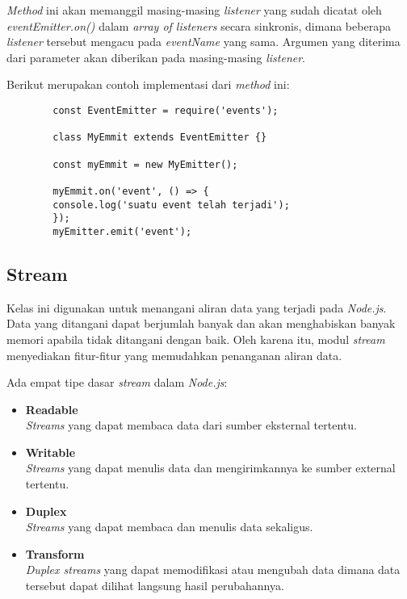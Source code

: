 \begin{itemize}
	\textit{Method} ini akan memanggil masing-masing \textit{listener} yang sudah dicatat oleh \textit{eventEmitter.on()} dalam \textit{array of listeners} secara sinkronis, dimana beberapa \textit{listener} tersebut mengacu pada \textit{eventName} yang sama. Argumen yang diterima dari parameter akan diberikan pada masing-masing \textit{listener}.
	
	Berikut merupakan contoh implementasi dari \textit{method} ini:
	\begin{lstlisting}
		const EventEmitter = require('events');
		
		class MyEmmit extends EventEmitter {}
		
		const myEmmit = new MyEmitter();
		
		myEmmit.on('event', () => {
		console.log('suatu event telah terjadi');	
		});
		myEmitter.emit('event');
	\end{lstlisting} 
\end{itemize}

\subsection{Stream}
Kelas ini digunakan untuk menangani aliran data yang terjadi pada \textit{Node.js}. Data yang ditangani dapat berjumlah banyak dan akan menghabiskan banyak memori apabila tidak ditangani dengan baik. Oleh karena itu, modul \textit{stream} menyediakan fitur-fitur yang memudahkan penanganan aliran data.

Ada empat tipe dasar \textit{stream} dalam \textit{Node.js}:
\begin{itemize}
	\item \textbf{Readable} \\ \textit{Streams} yang dapat membaca data dari sumber eksternal tertentu.
	\item \textbf{Writable} \\ \textit{Streams} yang dapat menulis data dan mengirimkannya ke sumber external tertentu.
	\item \textbf{Duplex} \\ \textit{Streams} yang dapat membaca dan menulis data sekaligus.
	\item \textbf{Transform} \\ \textit{Duplex streams} yang dapat memodifikasi atau mengubah data dimana data tersebut dapat dilihat langsung hasil perubahannya.
\end{itemize}

